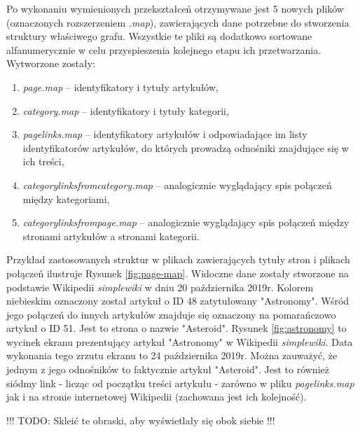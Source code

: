 Po wykonaniu wymienionych przekształceń otrzymywane jest 5 nowych plików (oznaczonych rozszerzeniem \textit{.map}), zawierających dane potrzebne do stworzenia struktury właściwego grafu. Wszystkie te pliki są dodatkowo sortowane alfanumerycznie w celu przyspieszenia kolejnego etapu ich przetwarzania. Wytworzone zostały:

\begin{enumerate}[label=\textbullet]
    \item \textit{page.map} – identyfikatory i tytuły artykułów,
    \item \textit{category.map} – identyfikatory i tytuły kategorii,
    \item \textit{pagelinks.map} – identyfikatory artykułów i odpowiadające im listy identyfikatorów artykułów, do których prowadzą odnośniki znajdujące się w ich treści,
    \item \textit{categorylinksfromcategory.map} – analogicznie wyglądający spis połączeń między kategoriami,
    \item \textit{categorylinksfrompage.map} – analogicznie wyglądający spis połączeń między stronami artykułów a stronami kategorii.
\end{enumerate}

Przykład zastosowanych struktur w plikach zawierających tytuły stron i plikach połączeń ilustruje Rysunek \ref{fig:page-map}. Widoczne dane zostały stworzone na podstawie Wikipedii \textit{simplewiki} w dniu 20 października 2019r. Kolorem niebieskim oznaczony został artykuł o ID 48 zatytułowany "Astronomy". Wśród jego połączeń do innych artykułów znajduje się oznaczony na pomarańczowo artykuł o ID 51. Jest to strona o nazwie "Asteroid". Rysunek \ref{fig:astronomy} to wycinek ekranu prezentujący artykuł "Astronomy" w Wikipedii \textit{simplewiki}. Data wykonania tego zrzutu ekranu to 24 października 2019r. Można zauważyć, że jednym z jego odnośników to faktycznie artykuł "Asteroid". Jest to również siódmy link - licząc od początku treści artykułu - zarówno w pliku \textit{pagelinks.map} jak i na stronie internetowej Wikipedii (zachowana jest ich kolejność).


!!! TODO: Skleić te obraski, aby wyświetlały się obok siebie !!!

